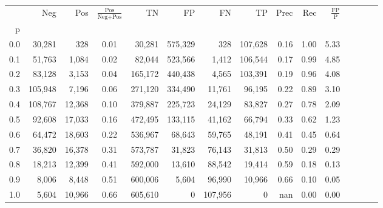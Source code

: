 \begin{tabular}{rrrcrrrrrrrrrrr}
\toprule
{} &      Neg &     Pos & $\frac{\text{Pos}}{\text{Neg}+\text{Pos}}$ &       TN &       FP &       FN &       TP &  Prec &   Rec & $\frac{\text{FP}}{\text{P}}$ \\
p   &          &         &                                            &          &          &          &          &       &       &                              \\
\midrule
0.0 &   30,281 &     328 &                                       0.01 &   30,281 &  575,329 &      328 &  107,628 &  0.16 &  1.00 &                         5.33 \\
0.1 &   51,763 &   1,084 &                                       0.02 &   82,044 &  523,566 &    1,412 &  106,544 &  0.17 &  0.99 &                         4.85 \\
0.2 &   83,128 &   3,153 &                                       0.04 &  165,172 &  440,438 &    4,565 &  103,391 &  0.19 &  0.96 &                         4.08 \\
0.3 &  105,948 &   7,196 &                                       0.06 &  271,120 &  334,490 &   11,761 &   96,195 &  0.22 &  0.89 &                         3.10 \\
0.4 &  108,767 &  12,368 &                                       0.10 &  379,887 &  225,723 &   24,129 &   83,827 &  0.27 &  0.78 &                         2.09 \\
0.5 &   92,608 &  17,033 &                                       0.16 &  472,495 &  133,115 &   41,162 &   66,794 &  0.33 &  0.62 &                         1.23 \\
0.6 &   64,472 &  18,603 &                                       0.22 &  536,967 &   68,643 &   59,765 &   48,191 &  0.41 &  0.45 &                         0.64 \\
0.7 &   36,820 &  16,378 &                                       0.31 &  573,787 &   31,823 &   76,143 &   31,813 &  0.50 &  0.29 &                         0.29 \\
0.8 &   18,213 &  12,399 &                                       0.41 &  592,000 &   13,610 &   88,542 &   19,414 &  0.59 &  0.18 &                         0.13 \\
0.9 &    8,006 &   8,448 &                                       0.51 &  600,006 &    5,604 &   96,990 &   10,966 &  0.66 &  0.10 &                         0.05 \\
1.0 &    5,604 &  10,966 &                                       0.66 &  605,610 &        0 &  107,956 &        0 &   nan &  0.00 &                         0.00 \\
\bottomrule
\end{tabular}

